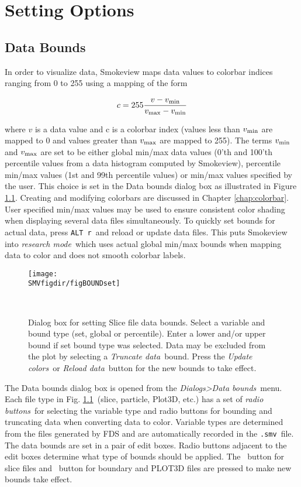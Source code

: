 \documentclass[11pt,twoside]{book}
\newcommand{\frameit}[1]{\fbox{\tt #1}}
\begin{document}
\chapter{Setting Options}
\label{chapter:settingoptions}
\section{Data Bounds}

In order to visualize data, Smokeview maps data values to colorbar indices ranging from 0 to 255 using a mapping of the form

\begin{eqnarray*}
c=255 \frac{v-v_{\rm min}}{v_{\rm max}-v_{\rm min}}
\end{eqnarray*}

\noindent where $v$ is a data value and c is a colorbar index (values less than $v_{\rm min}$ are mapped to 0 and values greater than $v_{\rm max}$ are mapped to 255). The terms $v_{\rm min}$ and $v_{\rm max}$ are set to be either global min/max data values (0'th and 100'th percentile values from a data histogram computed by Smokeview), percentile min/max values (1st and 99th percentile values) or min/max values specified by the user.  This choice is set in the Data bounds dialog box as illustrated in Figure \ref{figBOUNDSset}.
Creating and modifying colorbars are discussed in Chapter \ref{chap:colorbar}.
User specified min/max values may be used to ensure consistent color shading when
displaying several data files simultaneously.
To quickly set bounds for actual data, press {\tt ALT r}\ and reload or update data files.
This puts Smokeview into {\em research mode}\ which uses actual global min/max bounds
when mapping data to color and does not smooth colorbar labels.

\begin{figure}[bph]
\centerline{
\texttt{[image: \\SMVfigdir/figBOUNDset]}}
\caption[Dialog box for setting Slice file data bounds.]
{Dialog box for setting Slice file data bounds.
Select a variable and bound type (set, global  or percentile).  Enter a lower
and/or upper bound if set bound type was selected. Data may be excluded from the plot by
selecting a {\em Truncate data}\ bound.
Press the {\em Update colors}\ or {\em Reload data}\ button for
the new bounds to take effect.}\ \label{figBOUNDSset}
\end{figure}


The Data bounds dialog box is opened from the {\em
Dialogs>Data bounds}\ menu. Each file type in Fig. \ref{figBOUNDSset}\
(slice, particle, Plot3D, etc.) has a set of {\em radio buttons}\
for selecting the variable type and radio buttons for bounding and truncating data when converting data to color. Variable types are determined from the files generated
by FDS and are automatically recorded in the {\tt .smv}\ file. The
data bounds are set in a pair of edit boxes. Radio buttons
adjacent to the edit boxes determine what type of bounds should be
applied.  The \frameit{Update}\ button for slice files and \frameit{Reload}\ button for boundary and PLOT3D files are
pressed to make new bounds take effect.
\end{document}
